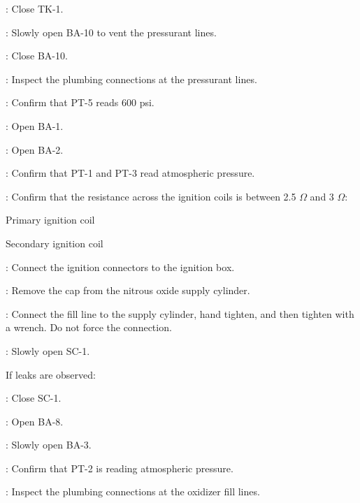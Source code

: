 \begin{checklist}
\begin{checklist}[label=$\bullet$]
        \begin{checklist}
            \item \primary{}: Close TK-1.
            \item \primary{}: Slowly open BA-10 to vent the pressurant lines.
            \item \primary{}: Close BA-10.
            \item \primary{}: Inspect the plumbing connections at the pressurant lines.
        \end{checklist}
    \end{checklist}
    \item \daq{}: Confirm that PT-5 reads 600 psi.
	\item \primary{}: Open BA-1.
	\item \primary{}: Open BA-2.
	\item \daq{}: Confirm that PT-1 and PT-3 read atmospheric pressure.
    \item \secondary{}: Confirm that the resistance across the ignition coils is between 2.5 $\Omega$ and 3 $\Omega$:
    \begin{checklist}
            \item Primary ignition coil
            \item Secondary ignition coil
    \end{checklist}
    \item \secondary{}: Connect the ignition connectors to the ignition box.
    \item \primary{}: Remove the cap from the nitrous oxide supply cylinder.
    \item \primary{}: Connect the fill line to the supply cylinder, hand tighten, and then tighten with a wrench. Do not force the connection.
    \item \primary{}: Slowly open SC-1.
    \begin{checklist}[label=$\bullet$]
        \item If leaks are observed:
        \begin{checklist}
            \item \primary{}: Close SC-1.
            \item \primary{}: Open BA-8.
            \item \primary{}: Slowly open BA-3.
            \item \daq{}: Confirm that PT-2 is reading atmospheric pressure.
            \item \primary{}: Inspect the plumbing connections at the oxidizer fill lines.

\end{checklist}
\end{checklist}
\end{checklist}
